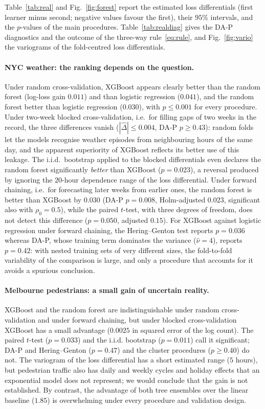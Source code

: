 Table~\ref{tab:real} and Fig.~\ref{fig:forest} report the estimated loss differentials (first learner minus second; negative values favour the first), their $95\%$ intervals, and the $p$-values of the main procedures. Table~\ref{tab:realdiag} gives the DA-P diagnostics and the outcome of the three-way rule~\eqref{eq:rule}, and Fig.~\ref{fig:vario} the variograms of the fold-centred loss differentials.

\paragraph{NYC weather: the ranking depends on the question.} Under random cross-validation, XGBoost appears clearly better than the random forest (log-loss gain $0.011$) and than logistic regression ($0.041$), and the random forest better than logistic regression ($0.030$), with $p\le0.001$ for every procedure. Under two-week blocked cross-validation, i.e.\ for filling gaps of two weeks in the record, the three differences vanish ($|\hat\Delta|\le0.004$, DA-P $p\ge0.43$): random folds let the models recognise weather episodes from neighbouring hours of the same day, and the apparent superiority of XGBoost reflects its better use of this leakage. The i.i.d.\ bootstrap applied to the blocked differentials even declares the random forest significantly \emph{better} than XGBoost ($p=0.023$), a reversal produced by ignoring the $20$-hour dependence range of the loss differential. Under forward chaining, i.e.\ for forecasting later weeks from earlier ones, the random forest is better than XGBoost by $0.030$ (DA-P $p=0.008$, Holm-adjusted $0.023$, significant also with $\rho_0=0.5$), while the paired $t$-test, with three degrees of freedom, does not detect this difference ($p=0.050$, adjusted $0.15$). For XGBoost against logistic regression under forward chaining, the Hering--Genton test reports $p=0.036$ whereas DA-P, whose training term dominates the variance ($\hat\nu=4$), reports $p=0.42$: with nested training sets of very different sizes, the fold-to-fold variability of the comparison is large, and only a procedure that accounts for it avoids a spurious conclusion.

\paragraph{Melbourne pedestrians: a small gain of uncertain reality.} XGBoost and the random forest are indistinguishable under random cross-validation and under forward chaining, but under blocked cross-validation XGBoost has a small advantage ($0.0025$ in squared error of the log count). The paired $t$-test ($p=0.033$) and the i.i.d. bootstrap ($p=0.011$) call it significant; DA-P and Hering--Genton ($p=0.47$) and the cluster procedures ($p\ge0.40$) do not. The variogram of the loss differential has a short estimated range ($5$ hours), but pedestrian traffic also has daily and weekly cycles and holiday effects that an exponential model does not represent; we would conclude that the gain is not established. By contrast, the advantage of both tree ensembles over the linear baseline ($1.85$) is overwhelming under every procedure and validation design.

